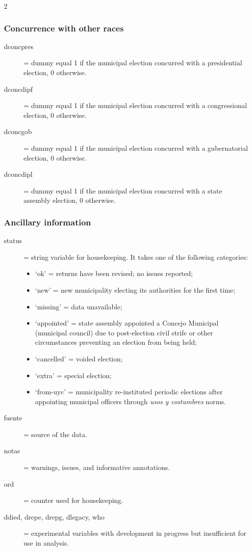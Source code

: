 \documentclass[letter,12pt]{article}
\begin{document}
\begin{singlespace}
\begin{multicols}{2}
\begin{footnotesize}
\subsubsection{Concurrence with other races}
\begin{description}
\item[dconcpres] = dummy equal 1 if the municipal election concurred with a presidential election, 0 otherwise. 
\item[dconcdipf] = dummy equal 1 if the municipal election concurred with a congressional election, 0 otherwise. 
\item[dconcgob]  = dummy equal 1 if the municipal election concurred with a gubernatorial election, 0 otherwise. 
\item[dconcdipl] = dummy equal 1 if the municipal election concurred with a state assembly election, 0 otherwise. 
\end{description}
\subsubsection{Ancillary information}
\begin{description}
\item[status] = string variable for housekeeping. It takes one of the following categories:
  \begin{itemize}
  \item `ok' = returns have been revised; no issues reported;
  \item `new' = new municipality electing its authorities for the first time;
  \item `missing' = data unavailable;
  \item `appointed' = state assembly appointed a Concejo Municipal (municipal council) due to post-election civil strife or other circumstances preventing an election from being held;
  \item `cancelled' = voided election;
  \item `extra' = special election;
  \item `from-uyc' = municipality re-instituted periodic elections after appointing municipal officers through \emph{usos y costumbres} norms.
  \end{itemize}
\item[fuente] = source of the data.
\item[notas] = warnings, issues, and informative annotations.
\item[ord] = counter used for housekeeping.
\item[ddied, drepe, drepg, dlegacy, who] = experimental variables with development in progress but insufficient for use in analysis.
\end{description}


\end{footnotesize}
\end{multicols}
\end{singlespace}
\end{document}
